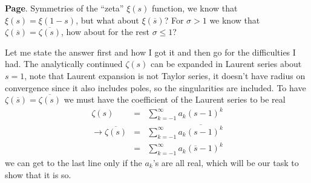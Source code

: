\documentclass[aps,preprint,preprintnumbers,nofootinbib,showpacs,prd]{revtex4-1}
\newcommand{\nbea}{\begin{eqnarray*}}
\newcommand{\neea}{\end{eqnarray*}}
\begin{document}
{\bf Page}. Symmetries of the ``zeta'' $\xi(s)$ function, we know that $\xi(s) = \xi(1-s)$, but what about $\xi(\overline{s})$? For $\sigma > 1$ we know that $\zeta(\overline{s}) = \overline{\zeta(s)}$, how about for the rest $\sigma \le 1$?

Let me state the answer first and how I got it and then go for the difficulties I had. The analytically continued $\zeta(s)$ can be expanded in Laurent series about $s=1$, note that Laurent expansion is not Taylor series, it doesn't have radius on convergence since it also includes poles, so the singularities are included. To have $\zeta(\overline{s}) = \overline{\zeta(s)}$ we must have the coefficient of the Laurent series to be real
%
\nbea
\zeta(s) & = & \sum_{k=-1}^\infty a_k (s-1)^k \\
\to \overline{\zeta(s)} & = & \sum_{k=-1}^\infty \overline{a_k (s-1)^k} \\
& = & \sum_{k=-1}^\infty a_k (\overline{s}-1)^k
\neea
%
we can get to the last line only if the $a_k$'s are all real, which will be our task to show that it is so.
\end{document}
